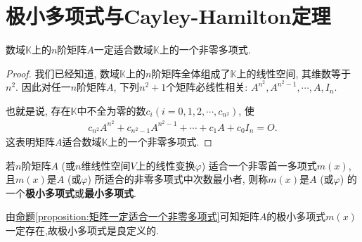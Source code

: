 \documentclass[../../main.tex]{subfiles}
\begin{document}
\section{极小多项式与Cayley-Hamilton定理}

\begin{proposition}\label{proposition:矩阵一定适合一个非零多项式}
数域$\mathbb{K}$上的$n$阶矩阵$A$一定适合数域$\mathbb{K}$上的一个非零多项式.
\end{proposition}
\begin{proof}
我们已经知道, 数域$\mathbb{K}$上的$n$阶矩阵全体组成了$\mathbb{K}$上的线性空间, 其维数等于$n^2$. 因此对任一$n$阶矩阵$A$, 下列$n^2 + 1$个矩阵必线性相关:
$A^{n^2}, A^{n^2-1}, \cdots, A, I_n$.

也就是说, 存在$\mathbb{K}$中不全为零的数$c_i (i = 0, 1, 2, \cdots, c_{n^2})$, 使
\begin{align*}
c_{n^2}A^{n^2} + c_{n^2-1}A^{n^2-1} + \cdots + c_1A + c_0I_n = O.
\end{align*}
这表明矩阵$A$适合数域$\mathbb{K}$上的一个非零多项式.
\end{proof}

\begin{definition}[矩阵的极小多项式]
若$n$阶矩阵$A$ (或$n$维线性空间$V$上的线性变换$\varphi$) 适合一个非零首一多项式$m(x)$, 且$m(x)$是$A$ (或$\varphi$) 所适合的非零多项式中次数最小者, 则称$m(x)$是$A$ (或$\varphi$) 的一个\textbf{极小多项式}或\textbf{最小多项式}.
\end{definition}
\begin{remark}
由\hyperref[proposition:矩阵一定适合一个非零多项式]{命题\ref{proposition:矩阵一定适合一个非零多项式}}可知矩阵$A$的极小多项式$m(x)$一定存在,故极小多项式是良定义的.
\end{remark}
\end{document}
